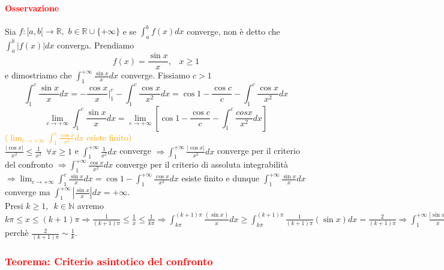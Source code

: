 \documentclass{article}
\newcommand{\R}{\mathbb{R}}
\newcommand{\N}{\mathbb{N}}
\begin{document}
\paragraph{\textcolor{red}{Osservazione}}
Sia $f: [a,b[ \rightarrow \R, \,\, b\in\R\cup\{+\infty\}$ e se $\int_{a}^{b} f(x) dx$ converge, non è detto che $\int_{a}^{b}|f(x)|dx$ converga.
Prendiamo
\begin{equation*}
    f(x)= \frac{\sin x}{x}, \,\,\,\,\, x \geq 1
\end{equation*}
e dimostriamo che $ \int_{1}^{+\infty} \frac{\sin x}{x} dx$ converge. Fissiamo $c>1$
\begin{equation*}
    \int_{1}^{c} \frac{\sin x}{x} dx= -\frac{\cos x}{x} |_{1}^{c} - \int_{1}^{c} \frac{\cos x}{x^2} dx = \cos 1 - \frac{\cos c}{c} -\int_{1}^{c} \frac{\cos x}{x^2} dx
\end{equation*}
\begin{equation*}
    \lim_{c \rightarrow +\infty} \int_{1}^{c} \frac{\sin x}{x} dx =\lim_{c \rightarrow +\infty} \left[\cos 1 -\frac{\cos c}{c} - \int_{1}^{c} \frac{cosx}{x^2}dx\right] 
\end{equation*}
\textcolor{orange}{($\lim_{c \rightarrow +\infty} \int_{1}^{c} \frac{\cos x}{x^2} dx$ esiste finito)}\\
$\frac{|\cos x|}{x^2} \leq \frac{1}{x^2} \,\,\, \forall x \geq 1$ e $ \int_{1}^{+\infty} \frac{1}{x^2} dx$ converge $\Rightarrow \int_{1}^{+\infty} \frac{|\cos x|}{x^2} dx$ converge per il criterio del confronto $\Rightarrow \int_{1}^{+\infty} \frac{\cos x}{x^2}dx$ converge per il criterio di assoluta integrabilità\\
$\Rightarrow \lim_{c \rightarrow +\infty} \int_{1}^{c} \frac{\sin x}{x} dx = \cos 1 - \int_{1}^{+\infty} \frac{\cos x}{x^2} dx$ esiste finito e dunque $\int_{1}^{+\infty} \frac{\sin x}{x} dx$ converge ma $\int_{1}^{+\infty} |\frac{\sin x}{x}|dx =+\infty$.\\
Presi $k \geq 1, \,\,\, k \in \N$ avremo $k\pi \leq x \leq (k+1)\pi \Longrightarrow \frac{1}{(k+1)\pi} \leq \frac{1}{x} \leq \frac{1}{k\pi} \Longrightarrow \int_{k\pi}^{(k+1)\pi} \frac{(\sin x)}{x}dx \geq \int_{k\pi}^{(k+1)\pi} \frac{1}{(k+1)\pi} (\sin x) dx = \frac{2}{(k+1)\pi} \Longrightarrow \int_{1}^{+\infty} \frac{|\sin{x}|}{x} dx \geq \sum_{k=1}^{\infty} \int_{k\pi}^{(k+1)\pi} \frac{|\sin{x}|}{x} dx \geq \sum_{k=1}^{\infty} \frac{2}{(k+1)\pi}=+\infty$  perchè $\frac{2}{(k+1)\pi} \sim \frac{1}{k}$.

\subsubsection{\textcolor{red}{Teorema: Criterio asintotico del confronto}}
\end{document}
